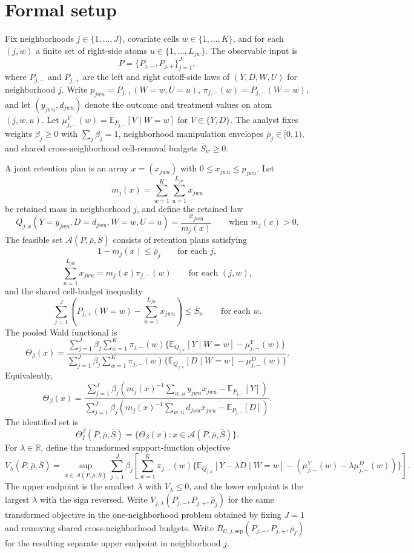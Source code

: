 \documentclass[11pt]{article}
\newcommand{\E}{\mathbb{E}}
\newcommand{\R}{\mathbb{R}}
\theoremstyle{definition}
\theoremstyle{plain}
\theoremstyle{remark}
\begin{document}
\section{Formal setup}
Fix neighborhoods \(j\in\{1,\ldots,J\}\), covariate cells \(w\in\{1,\ldots,K\}\), and for each
\((j,w)\) a finite set of right-side atoms \(u\in\{1,\ldots,L_{jw}\}\). The observable input is
\[
  P=\{P_{j,-},P_{j,+}\}_{j=1}^J,
\]
where \(P_{j,-}\) and \(P_{j,+}\) are the left and right cutoff-side laws of \((Y,D,W,U)\) for
neighborhood \(j\). Write \(p_{jwu}=P_{j,+}(W=w,U=u)\), \(\pi_{j,-}(w)=P_{j,-}(W=w)\), and let
\((y_{jwu},d_{jwu})\) denote the outcome and treatment values on atom \((j,w,u)\). Let
\(\mu^V_{j,-}(w)=\E_{P_{j,-}}[V\mid W=w]\) for \(V\in\{Y,D\}\). The analyst fixes weights
\(\beta_j\ge 0\) with \(\sum_j \beta_j=1\), neighborhood manipulation envelopes
\(\bar\rho_j\in[0,1)\), and shared cross-neighborhood cell-removal budgets \(\bar S_w\ge 0\).

A joint retention plan is an array \(x=(x_{jwu})\) with \(0\le x_{jwu}\le p_{jwu}\). Let
\[
  m_j(x)=\sum_{w=1}^K \sum_{u=1}^{L_{jw}} x_{jwu}
\]
be retained mass in neighborhood \(j\), and define the retained law
\[
  Q_{j,x}(Y=y_{jwu},D=d_{jwu},W=w,U=u)=\frac{x_{jwu}}{m_j(x)}
  \qquad \text{when }m_j(x)>0.
\]
The feasible set \(\mathcal A(P,\bar\rho,\bar S)\) consists of retention plans satisfying
\[
  1-m_j(x)\le \bar\rho_j \qquad \text{for each }j,
\]
\[
  \sum_{u=1}^{L_{jw}} x_{jwu}=m_j(x)\pi_{j,-}(w)
  \qquad \text{for each }(j,w),
\]
and the shared cell-budget inequality
\[
  \sum_{j=1}^J \left(P_{j,+}(W=w)-\sum_{u=1}^{L_{jw}} x_{jwu}\right)\le \bar S_w
  \qquad \text{for each }w.
\]
The pooled Wald functional is
\[
  \Theta_\beta(x)=
  \frac{\sum_{j=1}^J \beta_j
    \sum_{w=1}^K \pi_{j,-}(w)\{\E_{Q_{j,x}}[Y\mid W=w]-\mu^Y_{j,-}(w)\}}
       {\sum_{j=1}^J \beta_j
    \sum_{w=1}^K \pi_{j,-}(w)\{\E_{Q_{j,x}}[D\mid W=w]-\mu^D_{j,-}(w)\}}.
\]
Equivalently,
\[
  \Theta_\beta(x)=
  \frac{\sum_{j=1}^J \beta_j \left(
    m_j(x)^{-1}\sum_{w,u} y_{jwu}x_{jwu}-\E_{P_{j,-}}[Y]\right)}
       {\sum_{j=1}^J \beta_j \left(
    m_j(x)^{-1}\sum_{w,u} d_{jwu}x_{jwu}-\E_{P_{j,-}}[D]\right)}.
\]
The identified set is
\[
  \Theta_I^\beta(P,\bar\rho,\bar S)
  =\{\Theta_\beta(x):x\in \mathcal A(P,\bar\rho,\bar S)\}.
\]
For \(\lambda\in\R\), define the transformed support-function objective
\[
  V_\lambda(P,\bar\rho,\bar S)
  =
  \sup_{x\in\mathcal A(P,\bar\rho,\bar S)}
  \sum_{j=1}^J \beta_j
  \left[
    \sum_{w=1}^K \pi_{j,-}(w)
    \{\E_{Q_{j,x}}[Y-\lambda D\mid W=w]
     -(\mu^Y_{j,-}(w)-\lambda\mu^D_{j,-}(w))\}
  \right].
\]
The upper endpoint is the smallest \(\lambda\) with \(V_\lambda\le 0\), and the lower endpoint
is the largest \(\lambda\) with the sign reversed.
Write \(V_{j,\lambda}(P_{j,-},P_{j,+},\bar\rho_j)\) for the same transformed objective in the
one-neighborhood problem obtained by fixing \(J=1\) and removing shared cross-neighborhood
budgets. Write \(B_{U,j,\mathrm{sep}}(P_{j,-},P_{j,+},\bar\rho_j)\) for the resulting separate
upper endpoint in neighborhood \(j\).
\end{document}
